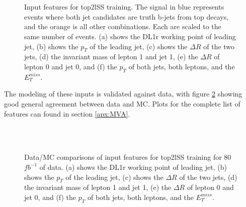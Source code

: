\begin{figure}[h!]
    \\
    \\
    \caption{Input features for top2lSS training. The signal in blue represents events where both jet candidates are truth b-jets from top decays, and the orange is all other combinations. Each are scaled to the same number of events. (a) shows the DL1r working point of leading jet, (b) shows the $p_T$ of the leading jet, (c) shows the $\Delta R$ of the two jets, (d) the invariant mass of lepton 1 and jet 1, (e) the $\Delta R$ of lepton 0 and jet 0, and (f) the $p_T$ of both jets, both leptons, and the $E_T^{miss}$.}
    \label{fig:features_top2lSS}                                                                                        
\end{figure}

The modeling of these inputs is validated against data, with figure \ref{fig:model_top2lSS} showing good general agreement between data and MC. Plots for the complete list of features can found in section \ref{apx:MVA}.

\begin{figure}[h!]
    \\
    \\
    \caption{Data/MC comparisons of input features for top2lSS training for 80 $fb^{-1}$ of data. (a) shows the DL1r working point of leading jet, (b) shows the $p_T$ of the leading jet, (c) shows the $\Delta R$ of the two jets, (d) the invariant mass of lepton 1 and jet 1, (e) the $\Delta R$ of lepton 0 and jet 0, and (f) the $p_T$ of both jets, both leptons, and the $E_T^{miss}$.}
    \label{fig:model_top2lSS}
\end{figure}

